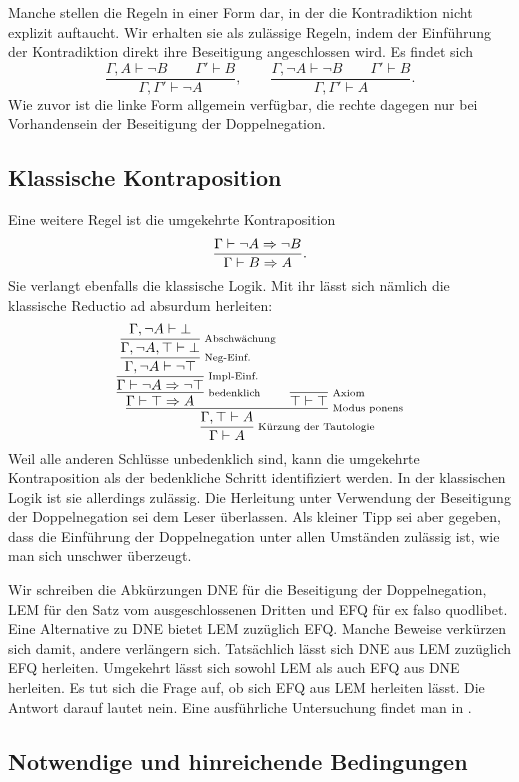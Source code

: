 Manche stellen die Regeln in einer Form dar, in der die Kontradiktion
nicht explizit auftaucht. Wir erhalten sie als zulässige Regeln, indem
der Einführung der Kontradiktion direkt ihre Beseitigung
angeschlossen wird. Es findet sich
\[\dfrac{\Gamma,A\vdash\lnot B\qquad\Gamma'\vdash B}
{\Gamma,\Gamma'\vdash\lnot A},\qquad
\dfrac{\Gamma,\lnot A\vdash\lnot B\qquad\Gamma'\vdash B}
{\Gamma,\Gamma'\vdash A}.\]
Wie zuvor ist die linke Form allgemein verfügbar, die rechte dagegen
nur bei Vorhandensein der Beseitigung der Doppelnegation.

\subsection{Klassische Kontraposition}

Eine weitere Regel ist die umgekehrte Kontraposition
\[\dfrac{\Gamma\vdash\lnot A\Rightarrow\lnot B}{\Gamma\vdash B\Rightarrow A}.\]
Sie verlangt ebenfalls die klassische Logik. Mit ihr lässt sich
nämlich die klassische Reductio ad absurdum herleiten:
\[
\infer[\infernote{Kürzung der Tautologie}]{\Gamma\vdash A}{
  \infer[\infernote{Modus ponens}]{\Gamma,\top\vdash A}{
    \infer[\infernote{bedenklich}]{\Gamma\vdash\top\cond A}{
      \infer[\infernote{Impl-Einf.}]{\Gamma\vdash\lnot A\cond\lnot\top}{
        \infer[\infernote{Neg-Einf.}]{\Gamma,\lnot A\vdash\lnot\top}{
          \infer[\infernote{Abschwächung}]{\Gamma,\lnot A,\top\vdash\bot}{
            \Gamma,\lnot A\vdash\bot}}}}
  & \infer[\infernote{Axiom}]{\top\vdash\top}{}}}
\]
Weil alle anderen Schlüsse unbedenklich sind, kann die umgekehrte
Kontraposition als der bedenkliche Schritt identifiziert werden.
In der klassischen Logik ist sie allerdings zulässig. Die Herleitung
unter Verwendung der Beseitigung der Doppelnegation sei dem Leser
überlassen. Als kleiner Tipp sei aber gegeben, dass die Einführung
der Doppelnegation unter allen Umständen zulässig ist, wie man sich
unschwer überzeugt.

Wir schreiben die Abkürzungen DNE für die Beseitigung der
Doppelnegation, LEM für den Satz vom ausgeschlossenen Dritten
und EFQ für ex falso quodlibet. Eine Alternative zu DNE bietet
LEM zuzüglich EFQ. Manche Beweise verkürzen sich damit, andere
verlängern sich. Tatsächlich lässt sich DNE aus LEM zuzüglich EFQ
herleiten. Umgekehrt lässt sich sowohl LEM als auch EFQ aus DNE
herleiten. Es tut sich die Frage auf, ob sich EFQ aus LEM herleiten
lässt. Die Antwort darauf lautet nein. Eine ausführliche Untersuchung
findet man in \cite{Diener}.

\subsection{Notwendige und hinreichende Bedingungen}

